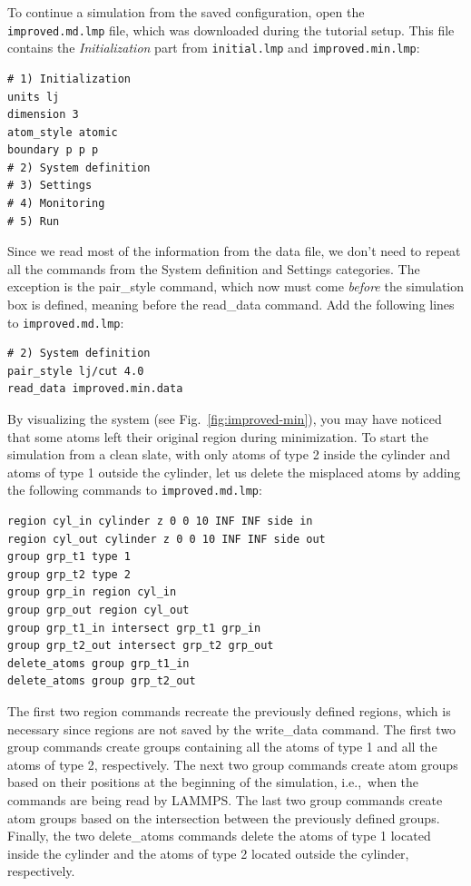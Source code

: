 \documentclass[9pt,tutorial]{livecoms}
\newcommand{\lmpcmd}[1]{\hspace{0pt}\colorbox{listing}{\textcolor{command}{\small{#1}}}\hspace{0pt}} %
\newcommand{\flecmd}[1]{\textcolor{command}{\texttt{#1}}} %
\begin{document}
To continue a simulation from the saved configuration, open the
\flecmd{improved.md.lmp} file, which was downloaded during the tutorial setup.
This file contains the \textit{Initialization} part from \flecmd{initial.lmp}
and \flecmd{improved.min.lmp}:
\begin{lstlisting}
# 1) Initialization
units lj
dimension 3
atom_style atomic
boundary p p p
# 2) System definition
# 3) Settings
# 4) Monitoring
# 5) Run
\end{lstlisting}
Since we read most of the information from the data file, we don't need
to repeat all the commands from the \lmpcmd{System definition}
and \lmpcmd{Settings} categories.  The exception is the \lmpcmd{pair\_style}
command, which now must come \emph{before} the simulation box is defined,
meaning before the \lmpcmd{read\_data} command.  Add the following
lines to \flecmd{improved.md.lmp}:
\begin{lstlisting}
# 2) System definition
pair_style lj/cut 4.0
read_data improved.min.data
\end{lstlisting}

By visualizing the system (see Fig.~\ref{fig:improved-min}), you may
have noticed that some atoms left their original region during
minimization.  To start the simulation from a clean slate, with only
atoms of type 2 inside the cylinder and atoms of type 1 outside the
cylinder, let us delete the misplaced atoms by adding the following
commands to \flecmd{improved.md.lmp}:

\begin{lstlisting}
region cyl_in cylinder z 0 0 10 INF INF side in
region cyl_out cylinder z 0 0 10 INF INF side out
group grp_t1 type 1
group grp_t2 type 2
group grp_in region cyl_in
group grp_out region cyl_out
group grp_t1_in intersect grp_t1 grp_in
group grp_t2_out intersect grp_t2 grp_out
delete_atoms group grp_t1_in
delete_atoms group grp_t2_out
\end{lstlisting}
The first two \lmpcmd{region} commands recreate the previously defined
regions, which is necessary since regions are not saved by the
\lmpcmd{write\_data} command.  The first two \lmpcmd{group} commands
create groups containing all the atoms of type 1 and all the
atoms of type 2, respectively.  The next two \lmpcmd{group} commands
create atom groups based on their positions at the beginning of the
simulation, i.e.,~when the commands are being read by LAMMPS.  The last
two \lmpcmd{group} commands create atom groups based on the intersection
between the previously defined groups.  Finally, the two
\lmpcmd{delete\_atoms} commands delete the atoms of type 1
located inside the cylinder and the atoms of type 2 located
outside the cylinder, respectively.
\end{document}
